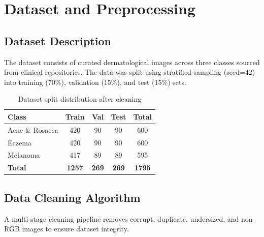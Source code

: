 \documentclass[10pt,a4paper,twocolumn]{article}
\begin{document}
\section{Dataset and Preprocessing}

\subsection{Dataset Description}

The dataset consists of curated dermatological images across three classes sourced from clinical repositories. The data was split using stratified sampling (seed=42) into training (70\%), validation (15\%), and test (15\%) sets.

\begin{table}[H]
\centering
\caption{Dataset split distribution after cleaning}
\label{tab:dataset}
\begin{tabular}{lccc|c}
\toprule
\textbf{Class} & \textbf{Train} & \textbf{Val} & \textbf{Test} & \textbf{Total} \\
\midrule
Acne \& Rosacea & 420 & 90 & 90 & 600 \\
Eczema & 420 & 90 & 90 & 600 \\
Melanoma & 417 & 89 & 89 & 595 \\
\midrule
\textbf{Total} & \textbf{1257} & \textbf{269} & \textbf{269} & \textbf{1795} \\
\bottomrule
\end{tabular}
\end{table}

\subsection{Data Cleaning Algorithm}

A multi-stage cleaning pipeline removes corrupt, duplicate, undersized, and non-RGB images to ensure dataset integrity.
\end{document}
